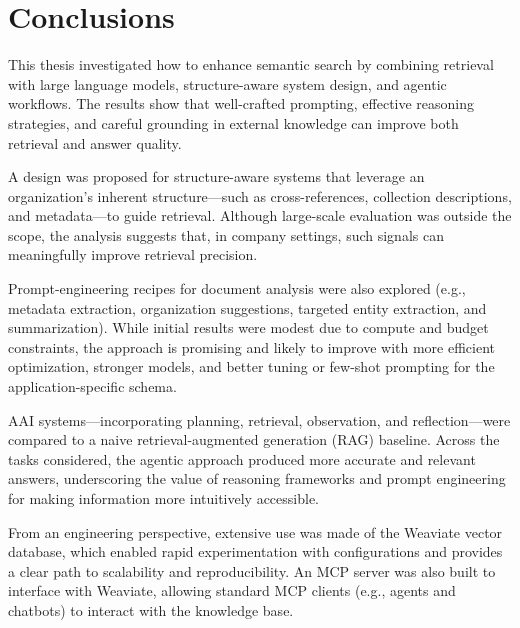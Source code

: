 \cleardoublepage%
\label{chap:conclusion}%


\section{Conclusions}
This thesis investigated how to enhance semantic search by combining retrieval with large language models, structure-aware system design, and agentic workflows. The results show that well-crafted prompting, effective reasoning strategies, and careful grounding in external knowledge can improve both retrieval and answer quality.

A design was proposed for structure-aware systems that leverage an organization's inherent structure—such as cross-references, collection descriptions, and metadata—to guide retrieval. Although large-scale evaluation was outside the scope, the analysis suggests that, in company settings, such signals can meaningfully improve retrieval precision.

Prompt-engineering recipes for document analysis were also explored (e.g., metadata extraction, organization suggestions, targeted entity extraction, and summarization). While initial results were modest due to compute and budget constraints, the approach is promising and likely to improve with more efficient optimization, stronger models, and better tuning or few-shot prompting for the application-specific schema.

\gls{AAI} systems—incorporating planning, retrieval, observation, and reflection—were compared to a naive retrieval-augmented generation (\gls{RAG}) baseline. Across the tasks considered, the agentic approach produced more accurate and relevant answers, underscoring the value of reasoning frameworks and prompt engineering for making information more intuitively accessible.

From an engineering perspective, extensive use was made of the Weaviate vector database, which enabled rapid experimentation with configurations and provides a clear path to scalability and reproducibility. An \gls{MCP} server was also built to interface with Weaviate, allowing standard \gls{MCP} clients (e.g., agents and chatbots) to interact with the knowledge base.


